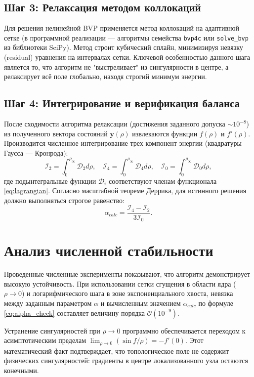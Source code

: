 \documentclass[12pt,a4paper]{article}
\begin{document}
\subsection{Шаг 3: Релаксация методом коллокаций}
Для решения нелинейной BVP применяется метод коллокаций на адаптивной сетке (в программной реализации — алгоритмы семейства \texttt{bvp4c} или \texttt{solve\_bvp} из библиотеки SciPy). Метод строит кубический сплайн, минимизируя невязку (residual) уравнения на интервалах сетки. 
Ключевой особенностью данного шага является то, что алгоритм не "выстреливает" из сингулярности в центре, а релаксирует всё поле глобально, находя строгий минимум энергии.

\subsection{Шаг 4: Интегрирование и верификация баланса}
После сходимости алгоритма релаксации (достижения заданного допуска $\sim 10^{-8}$) из полученного вектора состояний $\mathbf{y}(\rho)$ извлекаются функции $f(\rho)$ и $f'(\rho)$. Производится численное интегрирование трех компонент энергии (квадратуры Гаусса — Кронрода):
\begin{equation}
\mathcal{I}_2 = \int_0^{\rho_\infty} \mathcal{D}_2 d\rho, \quad \mathcal{I}_4 = \int_0^{\rho_\infty} \mathcal{D}_4 d\rho, \quad \mathcal{I}_0 = \int_0^{\rho_\infty} \mathcal{D}_0 d\rho,
\end{equation}
где подынтегральные функции $\mathcal{D}_i$ соответствуют членам функционала \eqref{eq:lagrangian}.
Согласно масштабной теореме Деррика, для истинного решения должно выполняться строгое равенство:
\begin{equation}
\alpha_{calc} = \frac{\mathcal{I}_4 - \mathcal{I}_2}{3\mathcal{I}_0}.
\label{eq:alpha_check}
\end{equation}

\section{Анализ численной стабильности}
Проведенные численные эксперименты показывают, что алгоритм демонстрирует высокую устойчивость. При использовании сетки сгущения в области ядра ($\rho \to 0$) и логарифмического шага в зоне экспоненциального хвоста, невязка между заданным параметром $\alpha$ и вычисленным значением $\alpha_{calc}$ по формуле \eqref{eq:alpha_check} составляет величину порядка $\mathcal{O}(10^{-9})$.

Устранение сингулярностей при $\rho \to 0$ программно обеспечивается переходом к асимптотическим пределам $\lim_{\rho \to 0} (\sin f / \rho) = -f'(0)$. Этот математический факт подтверждает, что топологическое поле не содержит физических сингулярностей: градиенты в центре локализованного узла остаются конечными.
\end{document}
